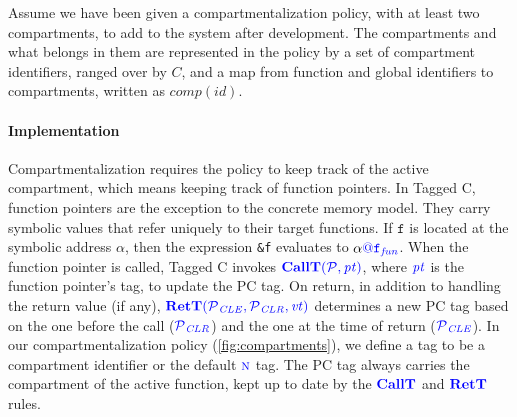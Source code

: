 \documentclass{llncs}
\begin{document}
Assume we have been given a compartmentalization policy, with at least two compartments, to add to the system
after development. The compartments and what belongs in them are represented in the policy by a set of compartment identifiers, ranged over by \(C\), and a map from function and global identifiers to compartments, written as \(\mathit{comp}(id)\).

\paragraph*{Implementation}

Compartmentalization requires the policy to keep track of the active compartment, which means
keeping track of function pointers. In Tagged C, function pointers are the exception to the
concrete memory model. They carry symbolic values that refer uniquely to their target functions.
If \(\mathtt{f}\) is located at the symbolic address \(\alpha\), then
the expression {\tt \&f} evaluates to \(\alpha\tagat\FN[f]\).
When the function pointer is called, Tagged C invokes \(\callt\), where \(\pt\) is the
function pointer's tag, to update the PC tag.
On return, in addition to handling the return value (if any), \(\rett\) determines a new PC tag
based on the one before the call (\(\PCT[_{CLR}]\)) and the one at the time of return (\(\PCT[_{CLE}]\)).
%
In our compartmentalization policy (\cref{fig:compartments}), we define a tag to be a compartment
identifier or the default \(\N\) tag. The PC tag always carries the compartment of the
active function, kept up to date by the \(\calltname\) and \(\rettname\) rules.
\end{document}
